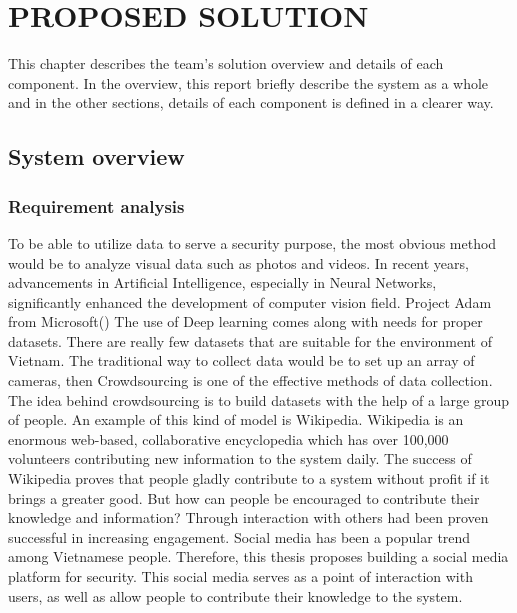 \chapter{PROPOSED SOLUTION}
\label{chap:solution}

This chapter describes the team's solution overview and details of each component. In the overview, this report briefly describe the system as a whole and in the other sections, details of each component is defined in a clearer way.
\section{System overview}
\subsection{Requirement analysis}
To be able to utilize data to serve a security purpose, the most obvious method would be to analyze visual data such as photos and videos.  In recent years, advancements in Artificial Intelligence, especially in Neural Networks, significantly enhanced the development of computer vision field. Project Adam from Microsoft() The use of Deep learning comes along with needs for proper datasets. There are really few datasets that are suitable for the environment of Vietnam. 
The traditional way to collect data would be to set up an array of cameras, then
Crowdsourcing is one of the effective methods of data collection. The idea behind crowdsourcing is to build datasets with the help of a large group of people. An example of this kind of model is Wikipedia. Wikipedia is an enormous web-based, collaborative encyclopedia which has over 100,000 volunteers contributing new information to the system daily. The success of Wikipedia proves that people gladly contribute to a system without profit if it brings a greater good. 
But how can people be encouraged to contribute their knowledge and information? Through interaction with others had been proven successful in increasing engagement. Social media has been a popular trend among Vietnamese people. Therefore, this thesis proposes building a social media platform for security. This social media serves as a point of interaction with users, as well as allow people to contribute their knowledge to the system.

